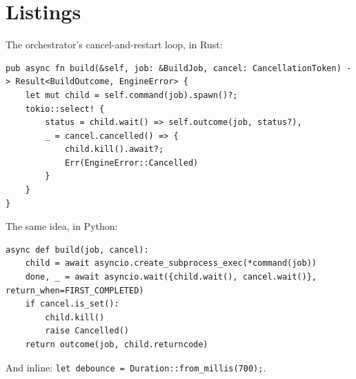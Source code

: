 \documentclass[11pt]{article}
\begin{document}
\section*{Listings}

The orchestrator's cancel-and-restart loop, in Rust:

\begin{verbatim}
pub async fn build(&self, job: &BuildJob, cancel: CancellationToken) -> Result<BuildOutcome, EngineError> {
    let mut child = self.command(job).spawn()?;
    tokio::select! {
        status = child.wait() => self.outcome(job, status?),
        _ = cancel.cancelled() => {
            child.kill().await?;
            Err(EngineError::Cancelled)
        }
    }
}
\end{verbatim}

The same idea, in Python:

\begin{verbatim}
async def build(job, cancel):
    child = await asyncio.create_subprocess_exec(*command(job))
    done, _ = await asyncio.wait({child.wait(), cancel.wait()}, return_when=FIRST_COMPLETED)
    if cancel.is_set():
        child.kill()
        raise Cancelled()
    return outcome(job, child.returncode)
\end{verbatim}

And inline: \texttt{let debounce = Duration::from_millis(700);}.
\end{document}
